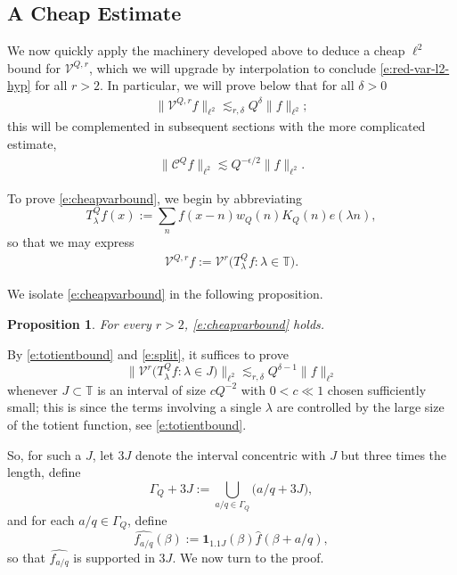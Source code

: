 \documentclass[12pt]{amsart}
\numberwithin{equation}{section}
\newtheorem{proposition}[theorem]{Proposition}
\theoremstyle{definition}
\begin{document}
\subsection{A Cheap Estimate}
We now quickly apply the machinery developed above to deduce a cheap $\ell^2$ bound for $\mathcal{V}^{Q,r}$, which we will upgrade by interpolation to conclude \eqref{e:red-var-l2-hyp} for all $r > 2$. In particular, we will prove below that for all $\delta>0$
\begin{align}\label{e:cheapvarbound}
    \| \mathcal{V}^{Q,r} f \|_{\ell^2} \lesssim_{r,\delta}  Q^{\delta}\|f \|_{\ell^2};
\end{align} 
this will be complemented in subsequent sections with the more complicated estimate,
\begin{align}
    \| \mathcal{C}^{Q} f \|_{\ell^2} \lesssim Q^{-\epsilon/2} \|f \|_{\ell^2}.
\end{align}

To prove \eqref{e:cheapvarbound}, we begin by abbreviating 
\[
    T_\lambda^Q f(x)
    :=
    \sum_n f(x-n)w_Q(n)K_Q(n)e(\lambda n),
\]
so that we may express
\begin{align}
    \mathcal{V}^{Q,r}f  := \mathcal{V}^r\big(T_\lambda^Q f:\lambda\in\mathbb T\big).
\end{align}

We isolate \eqref{e:cheapvarbound} in the following proposition.

\begin{proposition}\label{p:global-shell-var}
For every $r > 2$, \eqref{e:cheapvarbound} holds.
\end{proposition}

By \eqref{e:totientbound} and \eqref{e:split}, it suffices to prove
\begin{equation}
    \label{e:global-shell-var}
   \Big\|
    \mathcal{V}^r\big(T_\lambda^Q f:\lambda\in J\big)
    \Big\|_{\ell^2}   \lesssim_{r,\delta}
  Q^{\delta-1}
    \|f\|_{\ell^2}
\end{equation}
whenever $J \subset \mathbb{T}$ is an interval of size $c Q^{-2}$ with $0 <c \ll1$ chosen sufficiently small; this is since the terms involving a single $\lambda$ are controlled by the large size of the totient function, see \eqref{e:totientbound}.

So, for such a $J$, let $3J$ denote the interval concentric with $J$ but three times the length, define
\[
    \Gamma_Q+3J
    :=
    \bigcup_{a/q\in\Gamma_Q}\big(a/q+3J\big),
\]
and for each \(a/q\in\Gamma_Q\), define
\[
    \widehat{f_{a/q}}(\beta)
    := \mathbf 1_{1.1J}(\beta)
  \widehat{f}(\beta+a/q),
\]
so that \(\widehat{f_{a/q}}\) is supported in \(3J\). We now turn to the proof.
\end{document}
